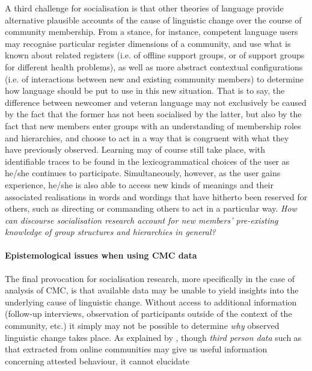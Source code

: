 A third challenge for socialisation is that other theories of language provide alternative plausible accounts of the cause of linguistic change over the course of community membership. From a  stance, for instance, competent language users may recognise particular register dimensions of a community, and use what is known about related registers (i.e. of offline support groups, or of support groups for different health problems), as well as more abstract contextual configurations (i.e. of interactions between new and existing community members) to determine how language should be put to use in this new situation. That is to say, the difference between newcomer and veteran language may not exclusively be caused by the fact that the former has not been socialised by the latter, but also by the fact that new members enter groups with an understanding of membership roles and hierarchies, and choose to act in a way that is congruent with what they have previously observed. Learning may of course still take place, with identifiable traces to be found in the lexicogrammatical choices of the user as he\slash she continues to participate. Simultaneously, however, as the user gains experience, he\slash she is also able to access new kinds of meanings and their associated realisations in words and wordings that have hitherto been reserved for others, such as directing or commanding others to act in a particular way. \emph{How can discourse socialisation research account for new members' pre\hyp{}existing knowledge of group structures and hierarchies in general?}

\paragraph{Epistemological issues when using CMC data}

The final provocation for socialisation research, more specifically in the case of analysis of \gls{CMC}, is that available data may be unable to yield insights into the underlying cause of linguistic change. Without access to additional information (follow\hyp{}up interviews, observation of participants outside of the context of the community, etc.) it simply may not be possible to determine \emph{why} observed linguistic change takes place. As explained by \textcite{widdowson_limitations_2000}, though \emph{third person data} such as that extracted from online communities may give us useful information concerning attested behaviour, it cannot elucidate

